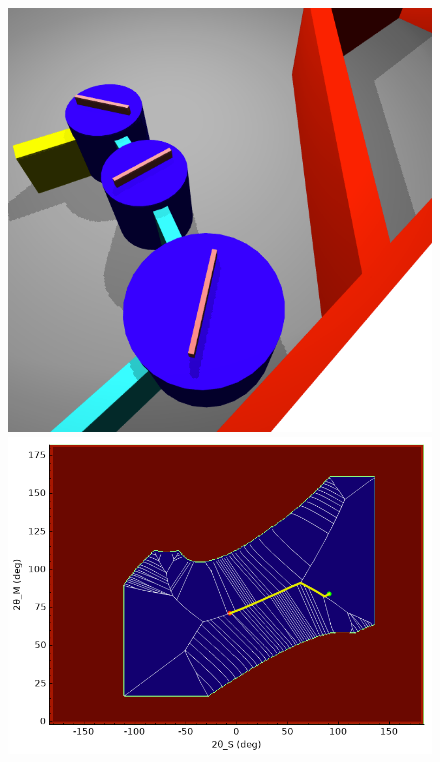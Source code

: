 \begin{figure}[htb]
\begin{center}
			\vspace{0.2cm}
			\includegraphics[width = 0.4 \textwidth]{figures/casestudy_step2}
			\hspace{0.5cm}
			\includegraphics[width = 0.55 \textwidth]{figures/casestudy_step2_cfg}
		\end{center}
	\caption[Case study: Path 1/2.]{
		\label{fig:casestudy_sequence1}}
\end{figure}

